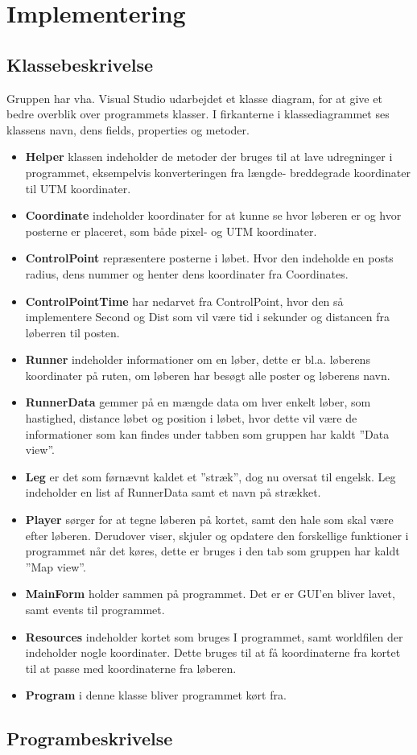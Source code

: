 \chapter{Implementering}

\section{Klassebeskrivelse}
Gruppen har vha. Visual Studio udarbejdet et klasse diagram, for at give et bedre overblik over programmets klasser. I firkanterne i klassediagrammet ses klassens navn, dens fields, properties og metoder.
\begin {itemize}
\item \textbf{Helper} klassen indeholder de metoder der bruges til at lave udregninger i programmet, eksempelvis konverteringen fra længde- breddegrade koordinater til UTM koordinater. 
\item \textbf{Coordinate} indeholder koordinater for at kunne se hvor løberen er og hvor posterne er placeret, som både pixel- og UTM koordinater. 
\item \textbf{ControlPoint} repræsentere posterne i løbet. Hvor den indeholde en posts radius, dens nummer og henter dens koordinater fra Coordinates.
\item \textbf{ControlPointTime} har nedarvet fra ControlPoint, hvor den så implementere Second og Dist som vil være tid i sekunder og distancen fra løberren til posten. 
\item \textbf{Runner} indeholder informationer om en løber, dette er bl.a. løberens koordinater på ruten, om løberen har besøgt alle poster og løberens navn.
\item \textbf{RunnerData} gemmer på en mængde data om hver enkelt løber, som hastighed, distance løbet og position i løbet, hvor dette vil være de informationer som kan findes under tabben som gruppen har kaldt ”Data view”. 
\item \textbf{Leg} er det som førnævnt kaldet et ”stræk”, dog nu oversat til engelsk. Leg indeholder en list af RunnerData samt et navn på strækket.
\item \textbf{Player} sørger for at tegne løberen på kortet, samt den hale som skal være efter løberen. Derudover viser, skjuler og opdatere den forskellige funktioner i programmet når det køres, dette er bruges i den tab som gruppen har kaldt ”Map view”.
\item \textbf{MainForm} holder sammen på programmet. Det er er GUI’en bliver lavet, samt events til programmet. 
\item \textbf{Resources} indeholder kortet som bruges I programmet, samt worldfilen der indeholder nogle koordinater. Dette bruges til at få koordinaterne fra kortet til at passe med koordinaterne fra løberen.
\item \textbf{Program} i denne klasse bliver programmet kørt fra.	
\end {itemize}

\section{Programbeskrivelse}


